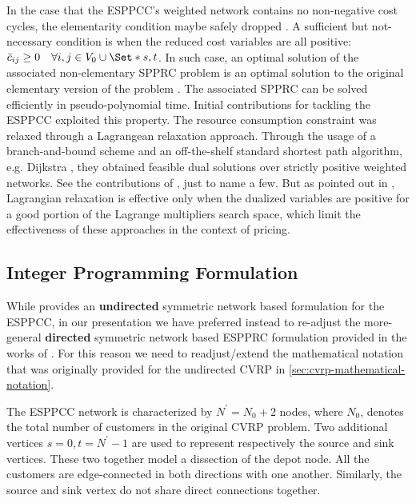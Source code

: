 \medskip

In the case that the ESPPCC's weighted network contains no non-negative
cost cycles, the elementarity condition maybe safely dropped \parencite{beasley1989}.
A sufficient but not-necessary condition is when the reduced cost variables
are all positive: $\bar{c}_{ij} \ge 0 \quad \forall i, j \in V_0 \cup \Set*{s, t}$.
In such case, an optimal solution of the associated non-elementary SPPRC problem
is an optimal solution to the original elementary version of the problem \parencite{beasley1989}.
The associated SPPRC can be solved efficiently in pseudo-polynomial time.
Initial contributions for tackling the ESPPCC exploited this property.
The resource consumption constraint was relaxed through a Lagrangean relaxation
approach.
Through the usage of a branch-and-bound scheme and an off-the-shelf
standard shortest path algorithm, e.g. Dijkstra \parencite{sniedovich2006dijkstra},
they obtained feasible dual solutions over strictly positive weighted networks.
See the contributions of
\textcite{beasley1989, dumitrescu2003improved, carlyle2008, muhandiramge2009simultaneous},
just to name a few.
But as pointed out in \textcite{righini2004},
Lagrangian relaxation is effective only when the dualized variables
are positive for a good portion of the Lagrange multipliers search space,
which limit the effectiveness of these approaches in the context of pricing.

\subsection{Integer Programming Formulation}
\label{sec:espprc-integer-programming-formulation}

While \textcite{jepsen2008branchandcut} provides
an \textbf{undirected} symmetric network based formulation for the ESPPCC,
in our presentation we have preferred instead to re-adjust the more-general
\textbf{directed} symmetric network based ESPPRC formulation
provided in the works of \textcite{beasley1989, toth2002, toth2014}.
For this reason we need to readjust/extend the
mathematical notation that was originally provided for the undirected CVRP in \cref{sec:cvrp-mathematical-notation}.

\medskip

The ESPPCC network is characterized by $N^\prime = N_0 + 2$ nodes,
where $N_0$, denotes the total number of customers in the original CVRP problem.
Two additional vertices $s = 0, t = N^\prime - 1$ are used to represent respectively the source and sink vertices.
These two together model a dissection of the depot node.
All the customers are edge-connected in both directions with one another.
Similarly, the source and sink vertex do not share direct connections together.

